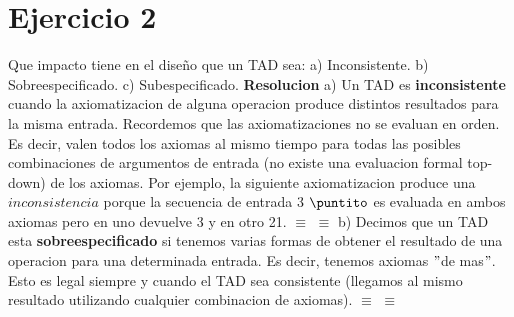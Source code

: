 \documentclass[10pt,a4paper]{article}
\begin{document}
\section{Ejercicio 2}

Que impacto tiene en el diseño que un TAD sea:
\newline
\newline
a) Inconsistente.
\newline
\newline
b) Sobreespecificado.
\newline
\newline
c) Subespecificado.
\newline
\newline
\textbf{Resolucion}
\newline
\newline
a) Un TAD es \textbf{inconsistente} cuando la axiomatizacion de alguna operacion produce distintos resultados para la misma entrada. Recordemos que las axiomatizaciones no se evaluan en orden. Es decir, valen todos los axiomas al mismo tiempo para todas las posibles combinaciones de argumentos de entrada (no existe una evaluacion formal top-down) de los axiomas.
\newline
\newline
Por ejemplo, la siguiente axiomatizacion produce una $inconsistencia$ porque la secuencia de entrada 3 $\puntito$  es evaluada en ambos axiomas pero en uno devuelve 3 y en otro 21.
\newline
\newline
{} $\equiv$  
\newline
\newline
{} $\equiv$  
\newline
\newline
b) Decimos que un TAD esta \textbf{sobreespecificado} si tenemos varias formas de obtener el resultado de una operacion para una determinada entrada. Es decir, tenemos axiomas $"$de mas$"$. Esto es legal siempre y cuando el TAD sea consistente (llegamos al mismo resultado utilizando cualquier combinacion de axiomas).
\newline
\newline
{} $\equiv$  
\newline
\newline
{} $\equiv$  
\newline
\end{document}
